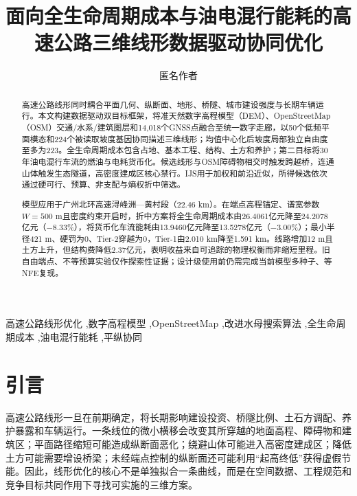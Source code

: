 \documentclass[preprint,12pt]{elsarticle}
\begin{document}
\begin{frontmatter}

\title{面向全生命周期成本与油电混行能耗的高速公路三维线形数据驱动协同优化}

\author[aff1]{匿名作者}

\begin{abstract}
高速公路线形同时耦合平面几何、纵断面、地形、桥隧、城市建设强度与长期车辆运行。本文构建数据驱动双目标框架，将准天然数字高程模型（DEM）、OpenStreetMap（OSM）交通/水系/建筑图层和14,018个GNSS点融合至统一数字走廊，以50个低频平面模态和224个被读取坡度基因协同描述三维线形；均值中心化后坡度局部独立自由度至多为223。全生命周期成本包含占地、基本工程、结构、土方和养护；第二目标将30年油电混行车流的燃油与电耗货币化。候选线形与OSM障碍物相交时触发跨越桥，连通山体触发生态隧道，高密度建成区核心禁行。IJS用于加权和前沿近似，所得候选依次通过硬可行、预算、非支配与熵权折中筛选。

模型应用于广州北环高速浔峰洲—黄村段（22.46 km）。在端点高程锚定、谱宽参数$W=500$ m且密度约束开启时，折中方案将全生命周期成本由26.4061亿元降至24.2078亿元（$-8.33\%$），将货币化车流能耗由13.9460亿元降至13.5278亿元（$-3.00\%$）；最小半径421 m、硬罚为0、Tier-2穿越为0，Tier-1由2.010 km降至1.591 km。线路增加12 m且土方上升，但结构费降低2.37亿元，表明收益来自可追踪的物理权衡而非缩短里程。旧自由端点、不等预算实验仅作探索性证据；设计级使用前仍需完成当前模型多种子、等NFE复现。
\end{abstract}

\begin{keyword}
高速公路线形优化 \sep 数字高程模型 \sep OpenStreetMap \sep 改进水母搜索算法 \sep 全生命周期成本 \sep 油电混行能耗 \sep 平纵协同
\end{keyword}
\end{frontmatter}

\linenumbers

\section{引言}

高速公路线形一旦在前期确定，将长期影响建设投资、桥隧比例、土石方调配、养护暴露和车辆运行。一条线位的微小横移会改变其所穿越的地面高程、障碍物和建筑区；平面路径缩短可能造成纵断面恶化；绕避山体可能进入高密度建成区；降低土方可能需要增设桥梁；未经端点控制的纵断面还可能利用“起高终低”获得虚假节能。因此，线形优化的核心不是单独拟合一条曲线，而是在空间数据、工程规范和竞争目标共同作用下寻找可实施的三维方案。
\end{document}
